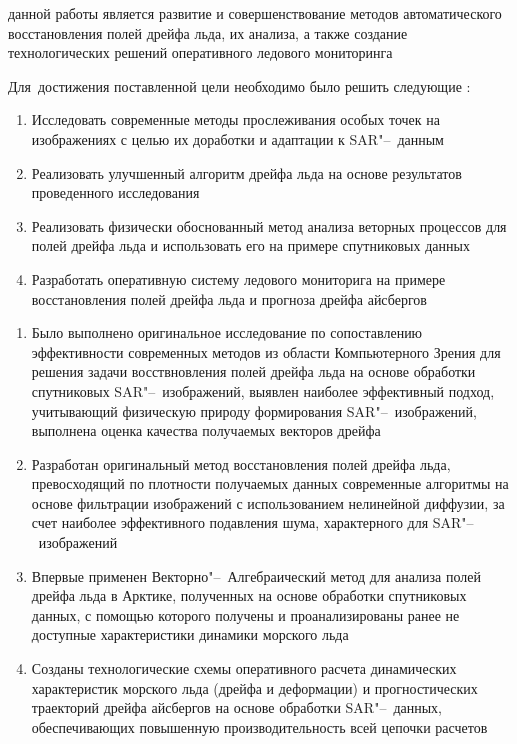 {\aim} данной работы является развитие и совершенствование методов автоматического восстановления полей дрейфа льда, их анализа, а также создание технологических решений оперативного ледового мониторинга

Для~достижения поставленной цели необходимо было решить следующие {\tasks}:
\begin{enumerate}
  \item Исследовать современные методы прослеживания особых точек на изображениях с целью их доработки и адаптации к SAR"--~данным
  \item Реализовать улучшенный алгоритм дрейфа льда на основе результатов проведенного исследования
  \item Реализовать физически обоснованный метод анализа веторных процессов для полей дрейфа льда и использовать его на примере спутниковых данных
  \item Разработать оперативную систему ледового мониторига на примере восстановления полей дрейфа льда и прогноза дрейфа айсбергов
\end{enumerate}


{\novelty}
\begin{enumerate}
  \item Было выполнено оригинальное исследование по сопоставлению эффективности современных методов из области Компьютерного Зрения для решения задачи восствновления полей дрейфа льда на основе обработки спутниковых SAR"--~изображений, выявлен наиболее эффективный подход, учитывающий физическую природу формирования SAR"--~изображений, выполнена оценка качества получаемых векторов дрейфа
  \item Разработан оригинальный метод восстановления полей дрейфа льда, превосходящий по плотности получаемых данных современные алгоритмы на основе фильтрации изображений с использованием нелинейной диффузии, за счет наиболее эффективного подавления шума, характерного для SAR"--~изображений
  \item Впервые применен Векторно"--~Алгебраический метод для анализа полей дрейфа льда в Арктике, полученных на основе обработки спутниковых данных, с помощью которого получены и проанализированы ранее не доступные характеристики динамики морского льда
  \item Созданы технологические схемы оперативного расчета динамических характеристик морского льда (дрейфа и деформации) и прогностических траекторий дрейфа айсбергов на основе обработки SAR"--~данных, обеспечивающих повышенную производительность всей цепочки расчетов
\end{enumerate}

